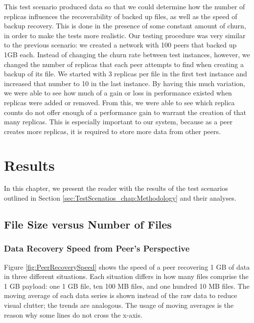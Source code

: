 \documentclass[12pt]{report}
\begin{document}
This test scenario produced data so that we could determine how the number of replicas influences the recoverability of backed up files, as well as the speed of backup recovery. This is done in the presence of some constant amount of churn, in order to make the tests more realistic. Our testing procedure was very similar to the previous scenario: we created a network with 100 peers that backed up 1GB each. Instead of changing the churn rate between test instances, however, we changed the number of replicas that each peer attempts to find when creating a backup of its file. We started with 3 replicas per file in the first test instance and increased that number to 10 in the last instance. By having this much variation, we were able to see how much of a gain or loss in performance existed when replicas were added or removed. From this, we were able to see which replica counts do not offer enough of a performance gain to warrant the creation of that many replicas. This is especially important to our system, because as a peer creates more replicas, it is required to store more data from other peers.

\chapter{Results} \label{chap:Results}

In this chapter, we present the reader with the results of the test scenarios outlined in Section \ref{sec:TestScenatios_chap:Methodology} and their analyses.

\section{File Size versus Number of Files} \label{sec:FileSizeversusNumberofFiles_chap:Results}

\subsection{Data Recovery Speed from Peer's Perspective} \label{subsec:DataRecoverySpeedfromPeersPerspective}

Figure \ref{fig:PeerRecoverySpeed} shows the speed of a peer recovering 1 GB of data in three different situations. Each situation differs in how many files comprise the 1 GB payload: one 1 GB file, ten 100 MB files, and one hundred 10 MB files. The moving average of each data series is shown instead of the raw data to reduce visual clutter; the trends are analogous. The usage of moving averages is the reason why some lines do not cross the x-axis.
\end{document}
